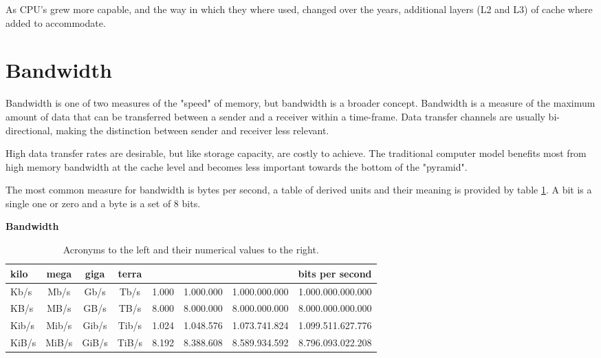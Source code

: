 As CPU's grew more capable, and the way in which they where used, changed over the years, additional layers (L2 and L3) of cache where added to accommodate.

\section{Bandwidth}

\hspace{4mm}Bandwidth is one of two measures of the "speed" of memory, but bandwidth is a broader concept. Bandwidth is a measure of the maximum amount of data that can be transferred between a sender and a receiver within a time-frame\autocite[]{wiki_bandwidth}. Data transfer channels are usually bi-directional, making the distinction between sender and receiver less relevant.\vspace{5mm}

High data transfer rates are desirable, but like storage capacity, are costly to achieve. The traditional computer model benefits most from high memory bandwidth at the cache level and becomes less important towards the bottom of the "pyramid".\vspace{5mm}

The most common measure for bandwidth is bytes per second, a table of derived units and their meaning is provided by table \ref{bandwidth table}. A bit is a single one or zero and a byte is a set of 8 bits.

\begin{table}[h!]
    \centering
    \caption*{\textbf{Bandwidth}}
    \begin{tabular}{l c c c || r r r r} 
        \hline
        kilo & mega & giga & terra & & & & bits per second \\ 
        \hline\hline
        Kb/s & Mb/s & Gb/s & Tb/s & 1.000 & 1.000.000 & 1.000.000.000 & 1.000.000.000.000 \\ 
        KB/s & MB/s & GB/s & TB/s & 8.000 & 8.000.000 & 8.000.000.000 & 8.000.000.000.000 \\
        Kib/s & Mib/s & Gib/s & Tib/s & 1.024 & 1.048.576 & 1.073.741.824 & 1.099.511.627.776 \\
        KiB/s & MiB/s & GiB/s & TiB/s & 8.192 & 8.388.608 & 8.589.934.592 & 8.796.093.022.208\\
        \hline
    \end{tabular}
    \caption{Acronyms to the left and their numerical values to the right.}
    \label{bandwidth table}
\end{table}

